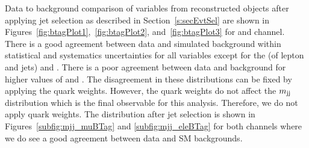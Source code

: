 
Data to background comparison of variables from reconstructed objects after 
applying \PQb jet selection as described in Section~\ref{s:secEvtSel} are shown in 
Figures~\ref{fig:btagPlot1},~\ref{fig:btagPlot2}, and~\ref{fig:btagPlot3} for
\mujets and \ejets channel. There is a good agreement between data and simulated background 
within statistical and systematics uncertainties for all variables except for the \pt (of lepton 
and jets) and \MET. There is a poor agreement between data and background for 
higher values of \pt and \MET. The disagreement in these distributions can be 
fixed by applying the \PQt quark \pt weights. However, the \PQt quark \pt weights do not affect 
the $m_\text{jj}$ distribution which is the final observable for this analysis.
Therefore, we do not apply \PQt quark \pt weights. The \mjj distribution after \PQb jet selection
is shown in Figures~\ref{subfig:mjj_muBTag} and \ref{subfig:mjj_eleBTag} for both channels
where we do see a good agreement between data and SM backgrounds.


